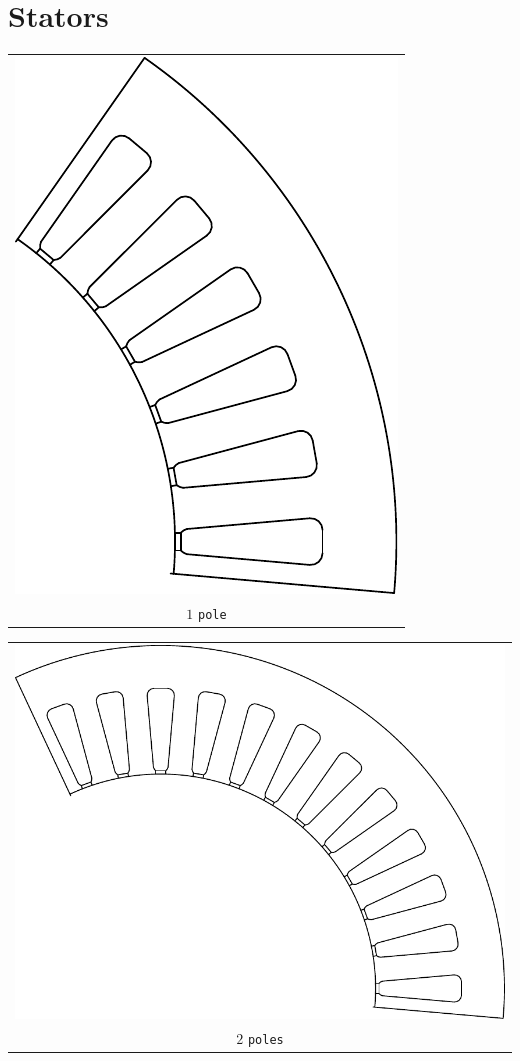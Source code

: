 \documentclass[a4paper,11pt,oneside,fleqn]{report}
\begin{document}
\section{Stators}
\begin{tabular}{c}
\includegraphics[scale=0.75]{../examples/stators/1pole} 
\\
$ 1 $ \texttt{pole}
\end{tabular}
\vspace{5mm}

\begin{tabular}{c}
\includegraphics[scale=0.75]{../examples/stators/2pole} 
\\
$ 2 $ \texttt{poles}
\end{tabular}
\vspace{5mm}
\end{document}
